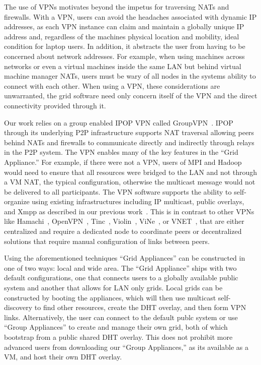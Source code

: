 \documentclass[conference]{IEEEtran}
\begin{document}
The use of VPNs motivates beyond the impetus for traversing NATs and firewalls.
With a VPN, users can avoid the headaches associated with dynamic IP addresses,
as each VPN instance can claim and maintain a globally unique IP address and,
regardless of the machines physical location and mobility, ideal condition for
laptop users.  In addition, it abstracts the user from having to be concerned
about network addresses.  For example, when using machines across networks or
even a virtual machines inside the same LAN but behind virtual machine manager
NATs, users must be wary of all nodes in the systems ability to connect with
each other.  When using a VPN, these considerations are unwarranted, the grid
software need only concern itself of the VPN and the direct connectivity
provided through it.

Our work relies on a group enabled IPOP VPN called GroupVPN~\cite{groupvpn}.
IPOP through its underlying P2P infrastructure supports NAT traversal allowing
peers behind NATs and firewalls to communicate directly and indirectly through
relays in the P2P system.  The VPN enables many of the key features in the
``Grid Appliance.'' For example, if there were not a VPN, users of MPI and
Hadoop would need to ensure that all resources were bridged to the LAN and not
through a VM NAT, the typical configuration, otherwise the multicast message
would not be delivered to all participants.  The VPN software supports the
ability to self-organize using existing infrastructures including IP multicast,
public overlays, and Xmpp as described in our previous
work~\cite{bootstrapping}.  This is in contrast to other VPNs like
Hamachi~\cite{hamachi}, OpenVPN~\cite{openvpn}, Tinc~\cite{tinc},
Violin~\cite{violin}, ViNe~\cite{vine}, or VNET~\cite{vnet}, that are either
centralized and require a dedicated node to coordinate peers or decentralized
solutions that require manual configuration of links between peers.

Using the aforementioned techniques ``Grid Appliances'' can be constructed in
one of two ways: local and wide area.  The ``Grid Appliance'' ships with two
default configurations, one that connects users to a globally available public
system and another that allows for LAN only grids.  Local grids can be
constructed by booting the appliances, which will then use multicast
self-discovery to find other resources, create the DHT overlay, and then form
VPN links.  Alternatively, the user can connect to the default publc system or
use ``Group Appliances'' to create and manage their own grid, both of which
bootstrap from a public shared DHT overlay.  This does not prohibit more
advanced users from downloading our ``Group Appliances,'' as its available as a
VM, and host their own DHT overlay.
\end{document}
